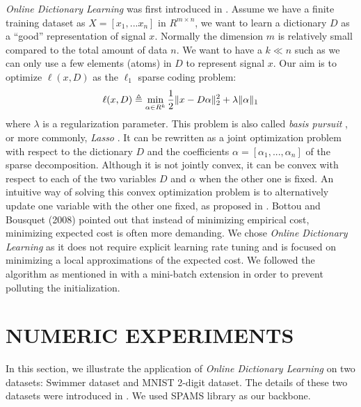 \documentclass[conference]{IEEEtran}
\begin{document}
\textit{Online Dictionary Learning} was first introduced in \cite{b4}. Assume we have a finite training dataset as $ X=[x_1,...x_n] $ in $R^{m\times n}$, we want to learn a dictionary $D$ as a ``good'' representation of signal $x$. Normally the dimension $m$ is relatively small compared to the total amount of data $n$. We want to have a $k\ll n$ such as we can only use a few elements (atoms) in $D$ to represent signal $x$. Our aim is to optimize $\ell(x, D)$ as the $\ell_{1}$ sparse coding problem:
$$ \ell(x, D) \triangleq \min\limits_{\alpha \in R^k} \frac{1}{2}\Arrowvert x-D\alpha \Arrowvert^{2}_{2}+\lambda\Arrowvert \alpha \Arrowvert_{1}$$
where $ \lambda $ is a regularization parameter. This problem is also called \textit{basis pursuit} \cite{b4}, or more commonly, \textit{Lasso}  \cite{b4}. It can be rewritten as a joint optimization problem with respect to the dictionary $D$ and the coefficients $\alpha=[\alpha_1,...,\alpha_n]$ of the
sparse decomposition. Although it is not jointly convex, it can be convex with respect to each of the two variables $D$ and $\alpha$ when
the other one is fixed. An intuitive way of solving this convex optimization problem is to alternatively update one variable with the other one fixed, as proposed in \cite{b4}. Bottou and Bousquet (2008) pointed out that instead of minimizing empirical cost, minimizing expected cost is often more demanding. We chose \textit{Online Dictionary Learning} as it does not require explicit learning
rate tuning and is focused on minimizing a local approximations of the expected cost. We followed the algorithm as mentioned in \cite{b4} with a mini-batch extension in order to prevent polluting the initialization.

\section{NUMERIC EXPERIMENTS}
In this section, we illustrate the application of \textit{Online Dictionary Learning} on two datasets: Swimmer dataset and MNIST 2-digit dataset. The details of these two datasets were introduced in \cite{b5}. We used SPAMS library \cite{b6,b7} as our backbone.

\end{document}
